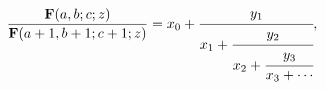 \[\frac{\mathop{\mathbf{F}\/}\nolimits\!\left(a,b;c;z\right)}{\mathop{\mathbf{F}%
\/}\nolimits\!\left(a+1,b+1;c+1;z\right)}={x_{0}+\cfrac{y_{1}}{x_{1}+\cfrac{y_%
{2}}{x_{2}+\cfrac{y_{3}}{x_{3}+\cdots}}}},\]